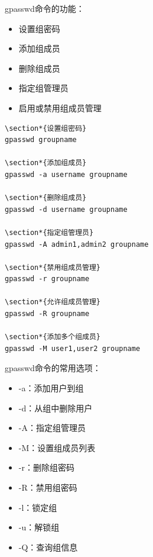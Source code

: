 \documentclass[12pt,UTF8]{ctexbook}
\begin{document}
gpasswd命令的功能：
\begin{itemize}
    \item 设置组密码
    \item 添加组成员
    \item 删除组成员
    \item 指定组管理员
    \item 启用或禁用组成员管理
\end{itemize}

\begin{verbatim}
\section*{设置组密码}
gpasswd groupname

\section*{添加组成员}
gpasswd -a username groupname

\section*{删除组成员}
gpasswd -d username groupname

\section*{指定组管理员}
gpasswd -A admin1,admin2 groupname

\section*{禁用组成员管理}
gpasswd -r groupname

\section*{允许组成员管理}
gpasswd -R groupname

\section*{添加多个组成员}
gpasswd -M user1,user2 groupname
\end{verbatim}

gpasswd命令的常用选项：
\begin{itemize}
    \item -a：添加用户到组
    \item -d：从组中删除用户
    \item -A：指定组管理员
    \item -M：设置组成员列表
    \item -r：删除组密码
    \item -R：禁用组密码
    \item -l：锁定组
    \item -u：解锁组
    \item -Q：查询组信息
\end{itemize}
\end{document}

